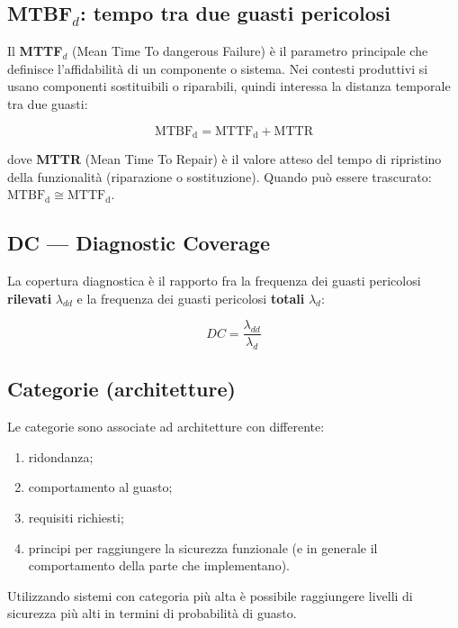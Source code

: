 \subsection{MTBF$_d$: tempo tra due guasti pericolosi}
Il \textbf{MTTF$_d$} (Mean Time To dangerous Failure) è il parametro principale che definisce l'affidabilità di un componente o sistema. Nei contesti produttivi si usano componenti sostituibili o riparabili, quindi interessa la distanza temporale tra due guasti:
\begin{key}
\[ \mathrm{MTBF_d} = \mathrm{MTTF_d} + \mathrm{MTTR} \]
\end{key}
dove \textbf{MTTR} (Mean Time To Repair) è il valore atteso del tempo di ripristino della funzionalità (riparazione o sostituzione). Quando può essere trascurato: $\mathrm{MTBF_d} \cong \mathrm{MTTF_d}$.

\subsection{DC — Diagnostic Coverage}
La copertura diagnostica è il rapporto fra la frequenza dei guasti pericolosi \textbf{rilevati} $\lambda_{dd}$ e la frequenza dei guasti pericolosi \textbf{totali} $\lambda_d$:
\begin{key}
\[ DC = \frac{\lambda_{dd}}{\lambda_d} \]
\end{key}

\subsection{Categorie (architetture)}
Le categorie sono associate ad architetture con differente:
\begin{enumerate}
    \item ridondanza;
    \item comportamento al guasto;
    \item requisiti richiesti;
    \item principi per raggiungere la sicurezza funzionale (e in generale il comportamento della parte che implementano).
\end{enumerate}
Utilizzando sistemi con categoria più alta è possibile raggiungere livelli di sicurezza più alti in termini di probabilità di guasto.

